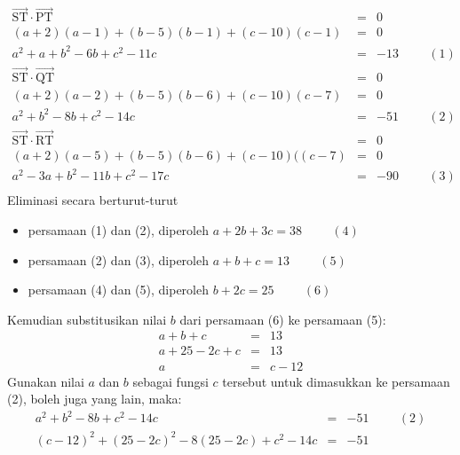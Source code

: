 \documentclass[11pt,fleqn]{exam}
\begin{document}
\begin{questions}
\begin{eqnarray*}
\overrightarrow{\text {ST}}\cdot \overrightarrow{\text {PT}}&=&0\\
(a+2)(a-1)+(b-5)(b-1)+(c-10)(c-1)&=&0\\
a^2+a+b^2-6b+c^2-11c&=&-13\hspace{1cm}(1)\\
\overrightarrow{\text {ST}}\cdot \overrightarrow{\text {QT}}&=&0\\
(a+2)(a-2)+(b-5)(b-6)+(c-10)(c-7)&=&0\\
a^2+b^2-8b+c^2-14c&=&-51\hspace{1cm}(2)\\
\overrightarrow{\text {ST}}\cdot \overrightarrow{\text {RT}}&=&0\\
(a+2)(a-5)+(b-5)(b-6)+(c-10)((c-7)&=&0\\
a^2-3a+b^2-11b+c^2-17c&=&-90\hspace{1cm}(3)\\
\end{eqnarray*}
Eliminasi secara berturut-turut
\begin{itemize}
\item persamaan (1) dan (2), diperoleh \hspace{1cm}$a+2b+3c=38\hspace{1cm}(4)$
\item persamaan (2) dan (3), diperoleh \hspace{1.4cm}$a+b+c=13\hspace{1cm}(5)$
\item persamaan (4) dan (5), diperoleh \hspace{1.9cm}$b+2c=25\hspace{1cm}(6)$
\end{itemize}
Kemudian substitusikan nilai $b$ dari persamaan (6) ke persamaan (5):
\begin{eqnarray*}
a+b+c&=&13\\
a+25-2c+c&=&13\\
a&=&c-12
\end{eqnarray*}
Gunakan nilai $a$ dan $b$ sebagai fungsi $c$ tersebut untuk dimasukkan ke persamaan (2), boleh juga yang lain, maka:
\begin{eqnarray*}
a^2+b^2-8b+c^2-14c&=&-51\hspace{1cm}(2)\\
(c-12)^2+(25-2c)^2-8(25-2c)+c^2-14c&=&-51\\

\end{eqnarray*}
\end{questions}
\end{document}
